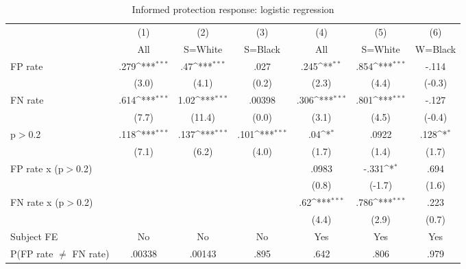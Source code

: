 \begin{table}[htbp]\centering
\def\sym#1{\ifmmode^{#1}\else\(^{#1}\)\fi}
\caption{Informed protection response: logistic regression}
\begin{tabular}{l*{6}{c}}
\hline\hline
                &\multicolumn{1}{c}{(1)}&\multicolumn{1}{c}{(2)}&\multicolumn{1}{c}{(3)}&\multicolumn{1}{c}{(4)}&\multicolumn{1}{c}{(5)}&\multicolumn{1}{c}{(6)}\\
                &\multicolumn{1}{c}{All}&\multicolumn{1}{c}{S=White}&\multicolumn{1}{c}{S=Black}&\multicolumn{1}{c}{All}&\multicolumn{1}{c}{S=White}&\multicolumn{1}{c}{W=Black}\\
\hline
FP rate         &     .279\sym{***}&      .47\sym{***}&     .027         &     .245\sym{**} &     .854\sym{***}&    -.114         \\
                &    (3.0)         &    (4.1)         &    (0.2)         &    (2.3)         &    (4.4)         &   (-0.3)         \\
FN rate         &     .614\sym{***}&     1.02\sym{***}&   .00398         &     .306\sym{***}&     .801\sym{***}&    -.127         \\
                &    (7.7)         &   (11.4)         &    (0.0)         &    (3.1)         &    (4.5)         &   (-0.4)         \\
p$>$0.2         &     .118\sym{***}&     .137\sym{***}&     .101\sym{***}&      .04\sym{*}  &    .0922         &     .128\sym{*}  \\
                &    (7.1)         &    (6.2)         &    (4.0)         &    (1.7)         &    (1.4)         &    (1.7)         \\
FP rate x (p$>$0.2)&                  &                  &                  &    .0983         &    -.331\sym{*}  &     .694         \\
                &                  &                  &                  &    (0.8)         &   (-1.7)         &    (1.6)         \\
FN rate x (p$>$0.2)&                  &                  &                  &      .62\sym{***}&     .786\sym{***}&     .223         \\
                &                  &                  &                  &    (4.4)         &    (2.9)         &    (0.7)         \\
Subject FE      &       No         &       No         &       No         &      Yes         &      Yes         &      Yes         \\
\hline
P(FP rate $\neq$ FN rate)&   .00338         &   .00143         &     .895         &     .642         &     .806         &     .979         \\

\end{tabular}
\end{table}
